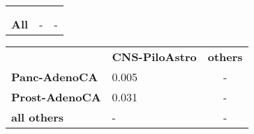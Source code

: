 \begin{table}[!htb]
\begin{subtable}[!h]{.5\textwidth}
\begin{tabular}{ p{3cm}p{2.7cm}c }
        &  &  \\
        &  &  \\
        \textbf{All} & - & - \\
        \end{tabular}
        \vspace{0.2cm}
    \end{subtable} 
    \quad %
    \begin{subtable}[!h]{.5\textwidth}
        \centering
        \begin{tabular}{ p{2.9cm}p{2.7cm}c }
        & \textbf{CNS-PiloAstro} & \textbf{others} \\
        \textbf{Panc-AdenoCA} & 0.005 & - \\
        \textbf{Prost-AdenoCA} & 0.031 & - \\
        \textbf{all others} & - & - \\
        \end{tabular}
        \vspace{0.2cm}
    \end{subtable}  
    
\end{table}

